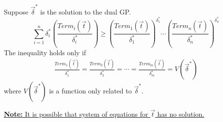 \documentclass[11pt,a4paper]{article}
\begin{document}
\begin{center}
\end{center}

Suppose $\vec{\delta}^*$ is the solution to the dual GP. $$\sum_{i=1}^n\delta^*_i\left(\frac{{Term}_i(\vec{t})}{\delta^*_i}\right)\geq \left(\frac{{Term}_1(\vec{t})}{\delta^*_1}\right)^{\delta^*_1}\cdots \left(\frac{{Term}_n(\vec{t})}{\delta^*_n}\right)^{\delta^*_n}$$
The inequality holds only if
\begin{equation}
    \begin{aligned}
        \frac{{Term}_1(\vec{t})}{\delta^*_1}=\frac{{Term}_2(\vec{t})}{\delta^*_2}=\cdots=\frac{{Term}_m(\vec{t})}{\delta^*_m}=V(\vec{\delta}^*)
    \end{aligned}
    \nonumber
\end{equation}
where $V(\vec{\delta}^*)$ is a function only related to $\vec{\delta}^*$.

\underline{\textbf{Note:} It is possible that system of equations for $\vec{t}$ has no solution.}
\end{document}
